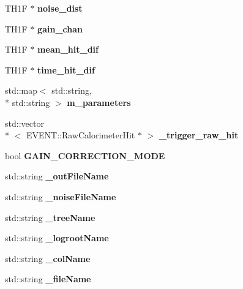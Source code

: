 \begin{DoxyCompactItemize}
\item 
T\-H1\-F $\ast$ {\bfseries noise\-\_\-dist}\label{classTriventProc_ac0a9072e3f7369a69a1279cd40742f5f}

\item 
T\-H1\-F $\ast$ {\bfseries gain\-\_\-chan}\label{classTriventProc_aec0086ff9d72ce4571ea717a951d7873}

\item 
T\-H1\-F $\ast$ {\bfseries mean\-\_\-hit\-\_\-dif}\label{classTriventProc_aa75d69847dd3dd9e46792239878b2bed}

\item 
T\-H1\-F $\ast$ {\bfseries time\-\_\-hit\-\_\-dif}\label{classTriventProc_a63e59016e4f099828dd6535439455548}

\item 
std\-::map$<$ std\-::string, \\*
std\-::string $>$ {\bfseries m\-\_\-parameters}\label{classTriventProc_a3514acac042237306ea8a869f38f7e68}

\item 
std\-::vector\\*
$<$ E\-V\-E\-N\-T\-::\-Raw\-Calorimeter\-Hit $\ast$ $>$ {\bfseries \-\_\-trigger\-\_\-raw\-\_\-hit}\label{classTriventProc_ab9d06de26636a08ead56e78aaa87e7a0}

\item 
bool {\bfseries G\-A\-I\-N\-\_\-\-C\-O\-R\-R\-E\-C\-T\-I\-O\-N\-\_\-\-M\-O\-D\-E}\label{classTriventProc_ac84895c8a6be617eb3332ab7a8ac37fe}

\item 
std\-::string {\bfseries \-\_\-out\-File\-Name}\label{classTriventProc_a387e40bdcac189c40e175e06815f02a5}

\item 
std\-::string {\bfseries \-\_\-noise\-File\-Name}\label{classTriventProc_a220762aa6135a107cee1ad913dad4a6d}

\item 
std\-::string {\bfseries \-\_\-tree\-Name}\label{classTriventProc_a769b399f40c85ccdeefb11e240a04524}

\item 
std\-::string {\bfseries \-\_\-logroot\-Name}\label{classTriventProc_a121c5cbee7cb958ed21c1a13d149b63f}

\item 
std\-::string {\bfseries \-\_\-col\-Name}\label{classTriventProc_adc5e858360c5d2ad5af169c5c626f914}

\item 
std\-::string {\bfseries \-\_\-file\-Name}\label{classTriventProc_a325f306ec60bc31a5d24e26ab6a4fddb}


\end{DoxyCompactItemize}
